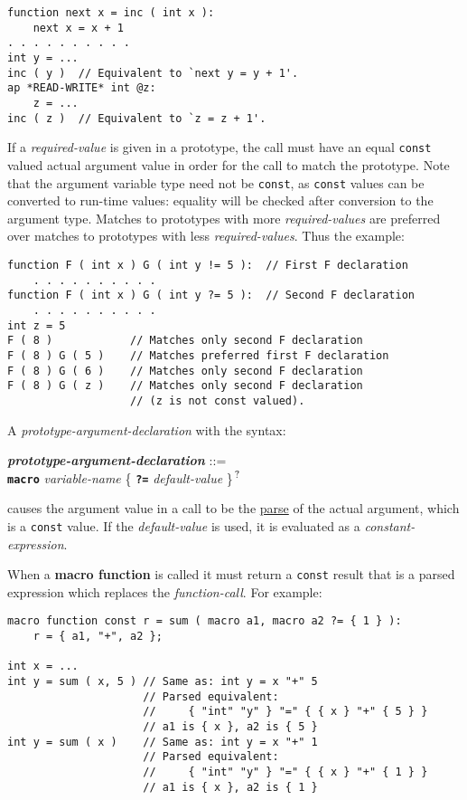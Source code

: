 \documentclass[12pt]{article}
\newcommand{\TT}[1]{{\tt \bfseries #1}}
\newcommand{\QMARK}{{$^{\,\mbox{\footnotesize ?}}$}}
\newcommand{\key}[1]{{\rm \bfseries #1}}
\newcommand{\emkey}[1]{{\em \bfseries #1}}
\newenvironment{indpar}[1][0.3in]%
	{\begin{list}{}%
		     {\setlength{\itemsep}{0in}%
		      \setlength{\topsep}{0in}%
		      \setlength{\parsep}{1ex}%
		      \setlength{\labelwidth}{#1}%
		      \setlength{\leftmargin}{#1}%
		      \addtolength{\leftmargin}{\labelsep}}%
	 \item}%
	{\end{list}}
\begin{document}
\begin{indpar}\begin{verbatim}
function next x = inc ( int x ):
    next x = x + 1
. . . . . . . . . .
int y = ...
inc ( y )  // Equivalent to `next y = y + 1'.
ap *READ-WRITE* int @z:
    z = ...
inc ( z )  // Equivalent to `z = z + 1'.
\end{verbatim}\end{indpar}

If a {\em required-value} is given in a prototype, the call must
have an equal {\tt const} valued actual argument value
in order for the call to match the prototype.
Note that the argument variable type need not be {\tt const},
as {\tt const} values can be converted to run-time values:
equality will be checked after conversion to the argument type.
Matches to prototypes with more {\em required-values}
are preferred over matches to prototypes with less {\em required-values}.
Thus the example:
\begin{indpar}\begin{verbatim}
function F ( int x ) G ( int y != 5 ):  // First F declaration
    . . . . . . . . . .
function F ( int x ) G ( int y ?= 5 ):  // Second F declaration
    . . . . . . . . . .
int z = 5
F ( 8 )            // Matches only second F declaration
F ( 8 ) G ( 5 )    // Matches preferred first F declaration
F ( 8 ) G ( 6 )    // Matches only second F declaration
F ( 8 ) G ( z )    // Matches only second F declaration
                   // (z is not const valued).
\end{verbatim}\end{indpar}

A {\em prototype-argument-declaration} with the syntax:
\begin{indpar}
\emkey{prototype-argument-declaration}\label{MACRO-ARGUMENT-DECLARATION} ::= \\
\hspace*{1in} \TT{macro} {\em variable-name}
                         \{ \TT{?=} {\em default-value} \}\QMARK{}
\end{indpar}
causes the argument value in a call to be the \underline{parse}
of the actual argument, which is a {\tt const} value.  If the
{\em default-value} is used, it is evaluated as a {\em constant-expression}.

When a \key{macro function} is called it must return a {\tt const} result
that is a parsed expression which replaces
the {\em function-call}.  For example:
\begin{indpar}\begin{verbatim}
macro function const r = sum ( macro a1, macro a2 ?= { 1 } ):
    r = { a1, "+", a2 };

int x = ...
int y = sum ( x, 5 ) // Same as: int y = x "+" 5
                     // Parsed equivalent:
                     //     { "int" "y" } "=" { { x } "+" { 5 } }
                     // a1 is { x }, a2 is { 5 }
int y = sum ( x )    // Same as: int y = x "+" 1
                     // Parsed equivalent:
                     //     { "int" "y" } "=" { { x } "+" { 1 } }
                     // a1 is { x }, a2 is { 1 }
\end{verbatim}\end{indpar}
\end{document}
